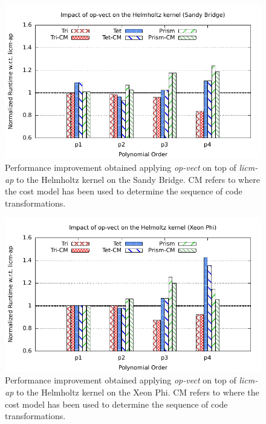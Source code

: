 \documentclass[conference]{IEEEtran}
\begin{document}
\begin{figure}[h]
\includegraphics[scale=0.7]{Pictures/helmholtz-normalized-opvect.pdf}
\caption{Performance improvement obtained applying \emph{op-vect} on top of \emph{licm-ap} to the Helmholtz kernel on the Sandy Bridge. CM refers to where the cost model has been used to determine the sequence of code transformations.}
\label{fig:opvect-helmholtz-speedup}
\end{figure}

\begin{figure}[h]
\includegraphics[scale=0.7]{Pictures/helmholtz-normalized-opvect-phi.pdf}
\caption{Performance improvement obtained applying \emph{op-vect} on top of \emph{licm-ap} to the Helmholtz kernel on the Xeon Phi. CM refers to where the cost model has been used to determine the sequence of code transformations.}
\label{fig:opvect-helmholtz-speedup-phi}
\end{figure}
\end{document}

